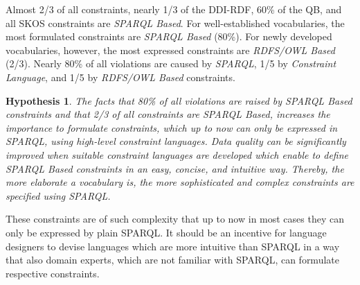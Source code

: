 \documentclass[conference]{IEEEtran}
\newtheorem{hyp}{Hypothesis}
\begin{document}
Almost 2/3 of all constraints, nearly 1/3 of the DDI-RDF, 60\% of the QB, and all SKOS constraints are \emph{SPARQL Based}. For well-established vocabularies, the most formulated constraints are \emph{SPARQL Based} (80\%). For newly developed vocabularies, however, the most expressed constraints are \emph{RDFS/OWL Based} (2/3). Nearly 80\% of all violations are caused by \emph{SPARQL}, 1/5 by \emph{Constraint Language}, and 1/5 by \emph{RDFS/OWL Based} constraints.
\begin{hyp}
The facts that 80\% of all violations are raised by SPARQL Based constraints and that 2/3 of all constraints are SPARQL Based, increases the importance to formulate constraints, which up to now can only be expressed in SPARQL, using high-level constraint languages. Data quality can be significantly improved when suitable constraint languages are developed which enable to define SPARQL Based constraints in an easy, concise, and intuitive way. Thereby, the more elaborate a vocabulary is, the more sophisticated and complex constraints are specified using SPARQL. 
\end{hyp} 

These constraints are of such complexity that up to now in most cases they can only be expressed by plain SPARQL. It should be an incentive for language designers to devise languages which are more intuitive than SPARQL in a way that also domain experts, which are not familiar with SPARQL, can formulate respective constraints.


\end{document}
